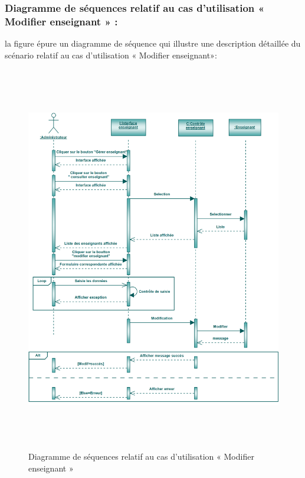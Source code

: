 \documentclass[12 pt ]{report}
\begin{document}
\subsubsection{Diagramme de séquences relatif au cas d’utilisation « Modifier enseignant » :}
la figure   épure un diagramme de séquence qui illustre une description détaillée du scénario relatif au cas d’utilisation «  Modifier enseignant»: 
{\begin{figure}[h]
 \begin{center}
\includegraphics[width= 18 cm ,height= 17cm]{sec_modif_ens.PNG}
\caption{Diagramme de séquences relatif au cas d’utilisation « Modifier enseignant »}

\end{center}
\end{figure}}
\newpage
\end{document}
